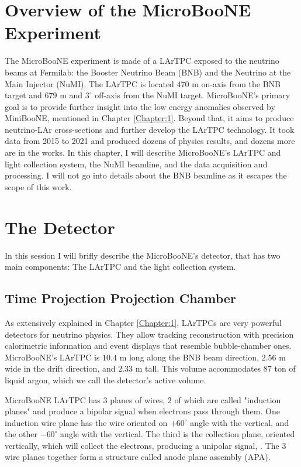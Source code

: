 \section{Overview of the MicroBooNE Experiment}
The MicroBooNE experiment is made of a LArTPC exposed to the neutrino beams at Fermilab: the Booster Neutrino Beam (BNB) and the Neutrino at the Main Injector (NuMI). The LArTPC is located $470$ m on-axis from the BNB target and $679$ m and $3^{\circ}$ off-axis from the NuMI target. MicroBooNE's primary goal is to provide further insight into the low energy anomalies observed by MiniBooNE, mentioned in Chapter \ref{Chapter:1}. Beyond that, it aims to produce neutrino-LAr cross-sections and further develop the LArTPC technology. It took data from 2015 to 2021 and produced dozens of physics results, and dozens more are in the works. 
In this chapter, I will describe MicroBooNE's LArTPC and light collection system, the NuMI beamline, and the data acquisition and processing. I will not go into details about the BNB beamline as it escapes the scope of this work.

\section{The Detector}

In this session I will brifly describe the MicroBooNE's detector, that has two main components: The LArTPC and the light collection system. 
\subsection{Time Projection Projection Chamber}
As extensively explained in Chapter \ref{Chapter:1}, LArTPCs are very powerful detectors for neutrino physics. They allow tracking reconstruction with precision calorimetric information and event displays that resemble bubble-chamber ones. MicroBooNE's LArTPC is $10.4$ m long along the BNB beam direction, $2.56$ m wide in the drift direction, and $2.33$ m tall. This volume accommodates $87$ ton of liquid argon, which we call the detector's active volume.  

MicroBooNE LArTPC has $3$ planes of wires, $2$ of which are called "induction planes" and produce a bipolar signal when electrons pass through them. One induction wire plane has the wire oriented on $+60^{\circ}$ angle with the vertical, and the other $-60^{\circ}$ angle with the vertical. The third is the collection plane, oriented vertically, which will collect the electrons, producing a unipolar signal, \cite{microboone_electronics}. The $3$ wire planes together form a structure called anode plane assembly (APA). 

